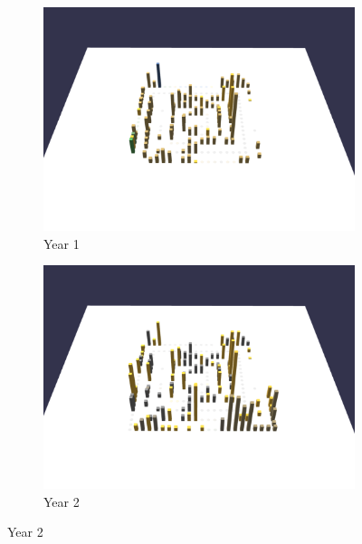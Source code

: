 \begin{figure}[h!]
    \begin{subfigure}{0.50\textwidth}
        \includegraphics[width=\linewidth]{JetUML_V3S1.png}
        \caption{Year 1} 
        \label{fig:JetUML_V3S1}
    \end{subfigure}\hspace*{\fill}
    \begin{subfigure}{0.50\textwidth}
        \includegraphics[width=\linewidth]{JetUML_V3S2.png}
        \caption{Year 2} 
        \label{fig:JetUML_V3S2}
    \end{subfigure}
    

\end{figure}
